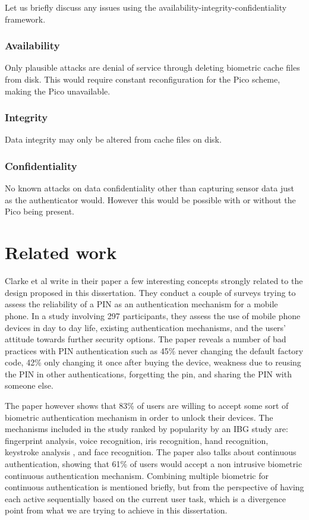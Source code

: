 Let us briefly discuss any issues using the availability-integrity-confidentiality framework.
	\subsubsection*{Availability}
	Only plausible attacks are denial of service through deleting biometric cache files from disk. This would require constant reconfiguration for the Pico scheme, making the Pico unavailable.
	
	\subsubsection*{Integrity}
	Data integrity may only be altered from cache files on disk.
	
	\subsubsection*{Confidentiality}
	No known attacks on data confidentiality other than capturing sensor data just as the authenticator would. However this would be possible with or without the Pico being present.

\section{Related work}
Clarke et al write in their paper \cite{clarke2005authentication} a few interesting concepts strongly related to the design proposed in this dissertation. They conduct a couple of surveys trying to assess the reliability of a PIN as an authentication mechanism for a mobile phone. In a study involving 297 participants, they assess the use of mobile phone devices in day to day life, existing authentication mechanisms, and the users' attitude towards further security options. The paper reveals a number of bad practices with PIN authentication such as 45\% never changing the default factory code, 42\% only changing it once after buying the device, weakness due to reusing the PIN in other authentications, forgetting the pin, and sharing the PIN with someone else.

The paper \cite{clarke2005authentication} however shows that 83\% of users are willing to accept some sort of biometric authentication mechanism in order to unlock their devices. The mechanisms included in the study ranked by popularity by an IBG study \cite{} are: fingerprint analysis, voice recognition, iris recognition, hand recognition, keystroke analysis \cite{clarke2003using}, and face recognition. The paper also talks about continuous authentication, showing that 61\% of users would accept a non intrusive biometric continuous authentication mechanism. Combining multiple biometric for continuous authentication is mentioned briefly, but from the perspective of having each active sequentially based on the current user task, which is a divergence point from what we are trying to achieve in this dissertation.

